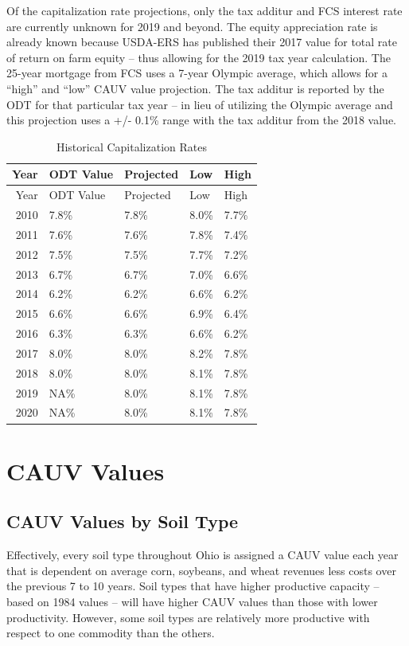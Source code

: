\documentclass[]{article}
\begin{document}
Of the capitalization rate projections, only the tax additur and FCS
interest rate are currently unknown for 2019 and beyond. The equity
appreciation rate is already known because USDA-ERS has published their
2017 value for total rate of return on farm equity -- thus allowing for
the 2019 tax year calculation. The 25-year mortgage from FCS uses a
7-year Olympic average, which allows for a ``high'' and ``low'' CAUV
value projection. The tax additur is reported by the ODT for that
particular tax year -- in lieu of utilizing the Olympic average and this
projection uses a +/- 0.1\% range with the tax additur from the 2018
value.

\begin{longtable}[]{@{}rllll@{}}
\caption{Historical Capitalization Rates}\tabularnewline
\toprule
Year & ODT Value & Projected & Low & High\tabularnewline
\midrule
\endfirsthead
\toprule
Year & ODT Value & Projected & Low & High\tabularnewline
\midrule
\endhead
2010 & 7.8\% & 7.8\% & 8.0\% & 7.7\%\tabularnewline
2011 & 7.6\% & 7.6\% & 7.8\% & 7.4\%\tabularnewline
2012 & 7.5\% & 7.5\% & 7.7\% & 7.2\%\tabularnewline
2013 & 6.7\% & 6.7\% & 7.0\% & 6.6\%\tabularnewline
2014 & 6.2\% & 6.2\% & 6.6\% & 6.2\%\tabularnewline
2015 & 6.6\% & 6.6\% & 6.9\% & 6.4\%\tabularnewline
2016 & 6.3\% & 6.3\% & 6.6\% & 6.2\%\tabularnewline
2017 & 8.0\% & 8.0\% & 8.2\% & 7.8\%\tabularnewline
2018 & 8.0\% & 8.0\% & 8.1\% & 7.8\%\tabularnewline
2019 & NA\% & 8.0\% & 8.1\% & 7.8\%\tabularnewline
2020 & NA\% & 8.0\% & 8.1\% & 7.8\%\tabularnewline
\bottomrule
\end{longtable}

\newpage

\hypertarget{cauv-values}{%
\section{CAUV Values}\label{cauv-values}}

\hypertarget{cauv-values-by-soil-type}{%
\subsection{CAUV Values by Soil Type}\label{cauv-values-by-soil-type}}

Effectively, every soil type throughout Ohio is assigned a CAUV value
each year that is dependent on average corn, soybeans, and wheat
revenues less costs over the previous 7 to 10 years. Soil types that
have higher productive capacity -- based on 1984 values -- will have
higher CAUV values than those with lower productivity. However, some
soil types are relatively more productive with respect to one commodity
than the others.
\end{document}
